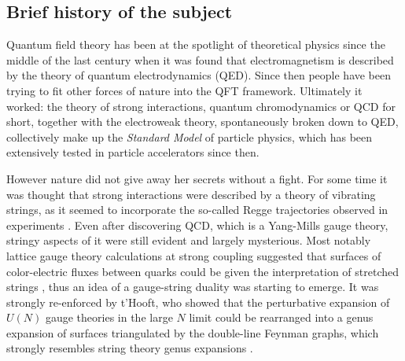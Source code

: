 \subsection{Brief history of the subject}

Quantum field theory has been at the spotlight of theoretical physics since the middle of the last century when it was found that electromagnetism is described by the theory of quantum electrodynamics (QED). Since then people have been trying to fit other forces of nature into the QFT framework. 
Ultimately it worked: the theory of strong interactions, quantum chromodynamics or QCD for short, together with the electroweak theory, spontaneously broken down to QED, collectively make up the \emph{Standard Model} of particle physics, which has been extensively tested in particle accelerators since then. 

However nature did not give away her secrets without a fight. 
For some time it was thought that strong interactions were described by a theory of vibrating strings, as it seemed to incorporate the so-called Regge trajectories observed in experiments \cite{Veneziano:1968}. 
Even after discovering QCD, which is a Yang-Mills gauge theory, stringy aspects of it were still evident and largely mysterious. 
Most notably lattice gauge theory calculations at strong coupling suggested that surfaces of color-electric fluxes between quarks could be given the interpretation of stretched strings \cite{Wilson:1974}, thus an idea of a gauge-string duality was starting to emerge. 
It was strongly re-enforced by t'Hooft, who showed that the perturbative expansion of $U(N)$ gauge theories in the large $N$ limit could be rearranged into a genus expansion of surfaces triangulated by the double-line Feynman graphs, which strongly resembles string theory genus expansions \cite{THooft:1974}.

\vspace{20pt}
\newlength\yearposx
{}
\vspace{20pt}

